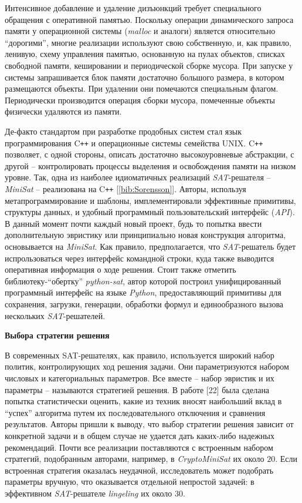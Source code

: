 Интенсивное добавление и удаление дизъюнкций требует специального обращения с оперативной памятью. Поскольку операции динамического запроса памяти у операционной системы (\textit{malloc} и аналоги) является относительно \enquote{дорогими}, многие реализации используют свою собственную, и, как правило, ленивую, схему управления памятью, основанную на пулах объектов, списках свободной памяти, кешировании и периодической сборке мусора. При запуске у системы запрашивается блок памяти достаточно большого размера, в котором размещаются объекты. При удалении они помечаются специальным флагом. Периодически производится операция сборки мусора, помеченные объекты физически удаляются из памяти.

Де-факто стандартом при разработке продобных систем стал язык программирования C\texttt{++} и операционные системы семейства UNIX.
C\texttt{++} позволяет, с одной стороны, описать достаточно высокоуровневые абстракции, с другой – контролировать процессы выделения и освобождения памяти на низком уровне. Так, одна из наиболее идиоматичных реализаций \textit{SAT}-решателя – \textit{MiniSat} – реализована на C\texttt{++} [\ref{bib:Sorensson}]. Авторы, используя метапрограммирование и шаблоны, имплементировали эффективные примитивы, структуры данных, и удобный программный пользовательский интерфейс (\textit{API}). В данный момент почти каждый новый проект, будь то попытка ввести дополнительную эвристику или принципиально новая конструкция алгоритма, основывается на \textit{MiniSat}. Как правило, предполагается, что \textit{SAT}-решатель будет испрользоваться через интерфейс командной строки, куда также выводится оперативная информация о ходе решения. Стоит также отметить библиотеку-\enquote{обертку} \textit{python-sat}, автор которой построил унифицированный программный интерфейс на языке \textit{Python}, предоставляющий примитивы для сохранения, загрузки, генерации, обработки формул и единообразного вызова нескольких \textit{SAT}-решателей.

\textbf{Выбора стратегии решения}

В современных SAT-решателях, как правило, используется широкий набор политик, контролирующих ход решения задачи. Они параметризуются набором числовых и категориальных параметров. Все вместе – набор эвристик и их параметры – называются стратегией решения. В работе [22] была сделана попытка статистически оценить, какие из техник вносят наибольший вклад в \enquote{успех} алгоритма путем их последовательного отключения и сравнения результатов. Авторы пришли к выводу, что выбор стратегии решения зависит от конкретной задачи и в общем случае не удается дать каких-либо надежных рекомендаций. Почти все реализации поставляются с встроенным набором стратегий, подобранным авторами, 
например, в \textit{CryptoMiniSat} их около $20$. Если встроенная стратегия оказалась неудачной, исследователь может подобрать параметры вручную, что оказывается отдельной непростой задачей: в эффективном \textit{SAT}-решателе \textit{lingeling} их около 30.

